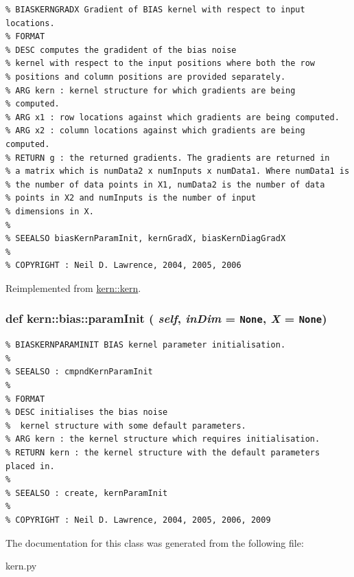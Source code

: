\footnotesize\begin{verbatim}% BIASKERNGRADX Gradient of BIAS kernel with respect to input locations.
% FORMAT
% DESC computes the gradident of the bias noise
% kernel with respect to the input positions where both the row
% positions and column positions are provided separately.
% ARG kern : kernel structure for which gradients are being
% computed.
% ARG x1 : row locations against which gradients are being computed.
% ARG x2 : column locations against which gradients are being computed.
% RETURN g : the returned gradients. The gradients are returned in
% a matrix which is numData2 x numInputs x numData1. Where numData1 is
% the number of data points in X1, numData2 is the number of data
% points in X2 and numInputs is the number of input
% dimensions in X.
%
% SEEALSO biasKernParamInit, kernGradX, biasKernDiagGradX
%
% COPYRIGHT : Neil D. Lawrence, 2004, 2005, 2006

\end{verbatim}
\normalsize
 

Reimplemented from \hyperlink{classkern_1_1kern}{kern::kern}.\hypertarget{classkern_1_1bias_39576d2e5f8f5fa8ffab2de6597bb295}{
\subsubsection[{paramInit}]{\setlength{\rightskip}{0pt plus 5cm}def kern::bias::paramInit ( {\em self}, \/   {\em inDim} = {\tt None}, \/   {\em X} = {\tt None})}}
\label{classkern_1_1bias_39576d2e5f8f5fa8ffab2de6597bb295}




\footnotesize\begin{verbatim}% BIASKERNPARAMINIT BIAS kernel parameter initialisation.
%
% SEEALSO : cmpndKernParamInit
%
% FORMAT
% DESC initialises the bias noise
%  kernel structure with some default parameters.
% ARG kern : the kernel structure which requires initialisation.
% RETURN kern : the kernel structure with the default parameters placed in.
%
% SEEALSO : create, kernParamInit
%
% COPYRIGHT : Neil D. Lawrence, 2004, 2005, 2006, 2009

\end{verbatim}
\normalsize
 

The documentation for this class was generated from the following file:\begin{CompactItemize}
\item 
kern.py\end{CompactItemize}
